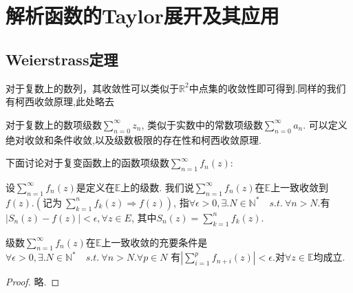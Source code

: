 \chapter{解析函数的{\rm Taylor}展开及其应用}
\section{Weierstrass定理}
    对于复数上的数列，其收敛性可以类似于$\mathbb{R}^2$中点集的收敛性即可得到.同样的我们有柯西收敛原理,此处略去\par
    对于复数上的数项级数$\displaystyle{\sum\limits_{n=0}^\infty z_n}$, 
    类似于实数中的常数项级数$\displaystyle{\sum\limits_{n=0}^\infty a_n}$.
    可以定义绝对收敛和条件收敛,以及级数极限的存在性和柯西收敛原理.\par
    下面讨论对于复变函数上的函数项级数$\displaystyle{\sum\limits_{n=1}^\infty f_n(z)}$:

\begin{mypro}
    设$\displaystyle{\sum\limits_{n=1}^\infty f_n(z)}$是定义在$\mathbb{E}$上的级数.
    我们说$\displaystyle{\sum\limits_{n=1}^\infty f_n(z)}$在$\mathbb{E}$上一致收敛到
    $f(z)$.$(\mbox{记为}\ \displaystyle{\sum\limits_{k=1}^n f_k(z)\Rightarrow f(z)})$,
    指$\forall\epsilon>0,\exists.N\in \mathbb{N}^*\quad s.t.\ \forall n>N$.有$\left|S_n(z)-f(z)\right|<\epsilon, \forall z\in E$,
    其中$\displaystyle{S_n(z)=\sum\limits_{k=1}^n f_k(z)}$.
\end{mypro}

\begin{mypro}
    级数$\displaystyle{\sum\limits_{n=1}^\infty f_n(z)}$在$\mathbb{E}$上一致收敛的充要条件是
    $\forall\epsilon>0,\exists.N\in \mathbb{N}^*\quad s.t.\ \forall n>N.\forall p\in N$
    有$\displaystyle{\left|\sum\limits_{i=1}^pf_{n+i}(z)\right|<\epsilon}$.对$\forall z\in\mathbb{E}$均成立.
\end{mypro}
\begin{proof}
    略.
\end{proof}

\begin{mypro}[函数项级数的weierstass判别法，略]
\end{mypro}

